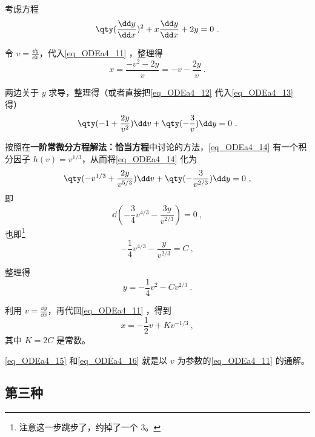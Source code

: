 \begin{example}{}
考虑方程
\begin{equation}\label{eq_ODEa4_11}
\qty(\frac{\dd y}{\dd x})^2+x\frac{\dd y}{\dd x}+2y=0~.
\end{equation}

令 $v=\frac{\dd y}{\dd x}$，代入\autoref{eq_ODEa4_11} ，整理得
\begin{equation}\label{eq_ODEa4_12}
x=\frac{-v^2-2y}{v}=-v-\frac{2y}{v}~.
\end{equation}



两边关于 $y$ 求导，整理得（或者直接把\autoref{eq_ODEa4_12} 代入\autoref{eq_ODEa4_13} 得）
\begin{equation}\label{eq_ODEa4_14}
\qty(-1+\frac{2y}{v^2})\dd v+\qty(-\frac{3}{v})\dd y=0~.
\end{equation}

按照在\textbf{一阶常微分方程解法：恰当方程}中讨论的方法，\autoref{eq_ODEa4_14} 有一个积分因子 $h(v)=v^{1/3}$，从而将\autoref{eq_ODEa4_14} 化为
\begin{equation}
\qty(-v^{1/3}+\frac{2y}{v^{5/3}})\dd v+\qty(-\frac{3}{v^{2/3}})\dd y=0~,
\end{equation}
即
\begin{equation}
\dd (-\frac{3}{4}v^{4/3}-\frac{3y}{v^{2/3}})=0~,
\end{equation}
也即\footnote{注意这一步跳步了，约掉了一个 $3$。}
\begin{equation}
-\frac{1}{4}v^{4/3}-\frac{y}{v^{2/3}}=C~,
\end{equation}

整理得
\begin{equation}\label{eq_ODEa4_15}
y=-\frac{1}{4}v^2-Cv^{2/3}~.
\end{equation}

利用 $v=\frac{\dd y}{\dd x}$，再代回\autoref{eq_ODEa4_11} ，得到
\begin{equation}\label{eq_ODEa4_16}
x=-\frac{1}{2}v+Kv^{-1/3}~,
\end{equation}
其中 $K=2C$ 是常数。

\autoref{eq_ODEa4_15} 和\autoref{eq_ODEa4_16} 就是以 $v$ 为参数的\autoref{eq_ODEa4_11} 的通解。



\end{example}



\subsection{第三种}

